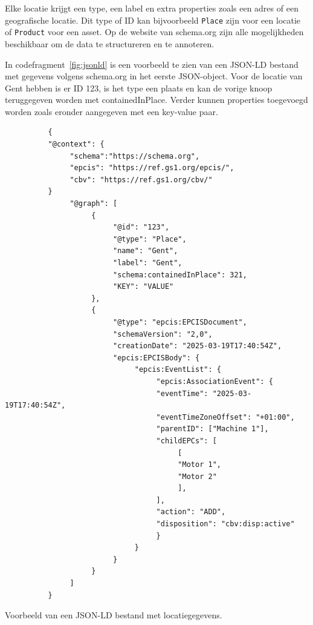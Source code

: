 Elke locatie krijgt een type, een label en extra properties zoals een adres of een geografische locatie.
Dit type of ID kan bijvoorbeeld \texttt{Place} zijn voor een locatie of \texttt{Product} voor een asset. 
Op de website van schema.org zijn alle mogelijkheden beschikbaar om de data te structureren en te annoteren.

In codefragment~\ref{fig:jsonld} is een voorbeeld te zien van een JSON-LD bestand met gegevens volgens schema.org in het eerste JSON-object.
Voor de locatie van Gent hebben is er ID 123, is het type een plaats en kan de vorige knoop teruggegeven worden met containedInPlace.
Verder kunnen properties toegevoegd worden zoals eronder aangegeven met een key-value paar.
\begin{listing}[H]
     \begin{verbatim}
          {
          "@context": {
               "schema":"https://schema.org",
               "epcis": "https://ref.gs1.org/epcis/",
               "cbv": "https://ref.gs1.org/cbv/"
          }
               "@graph": [
                    {
                         "@id": "123",
                         "@type": "Place",
                         "name": "Gent",
                         "label": "Gent",
                         "schema:containedInPlace": 321,
                         "KEY": "VALUE"
                    },
                    {
                         "@type": "epcis:EPCISDocument",
                         "schemaVersion": "2,0",
                         "creationDate": "2025-03-19T17:40:54Z",
                         "epcis:EPCISBody": {
                              "epcis:EventList": {
                                   "epcis:AssociationEvent": {
                                   "eventTime": "2025-03-19T17:40:54Z",
                                   "eventTimeZoneOffset": "+01:00",
                                   "parentID": ["Machine 1"],
                                   "childEPCs": [
                                        [
                                        "Motor 1",
                                        "Motor 2"
                                        ],
                                   ],
                                   "action": "ADD",
                                   "disposition": "cbv:disp:active"
                                   }
                              }
                         }
                    }
               ]
          }
     \end{verbatim}
     \caption[Voorbeeld JSON-LD bestand]{\label{fig:jsonld}Voorbeeld van een JSON-LD bestand met locatiegegevens.}
\end{listing}


